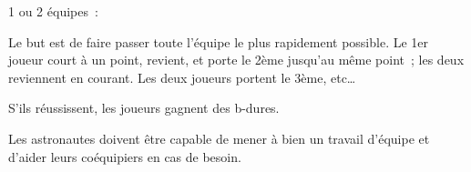 \documentclass{grand-jeu}
\begin{document}
\begin{regles}
1 ou 2 équipes :

Le but est de faire passer toute l’équipe le plus rapidement possible. 
Le 1er joueur court à un point, revient, et porte le 2ème jusqu’au même point ; les deux reviennent en courant. Les deux joueurs portent le 3ème, etc… 

S’ils réussissent, les joueurs gagnent des b-dures. 
\end{regles}

\begin{imaginaire}
Les astronautes doivent être capable de mener à bien un travail d'équipe et d'aider leurs coéquipiers en cas de besoin. 
\end{imaginaire}

\begin{moments-stop}
\end{moments-stop}
\end{document}
